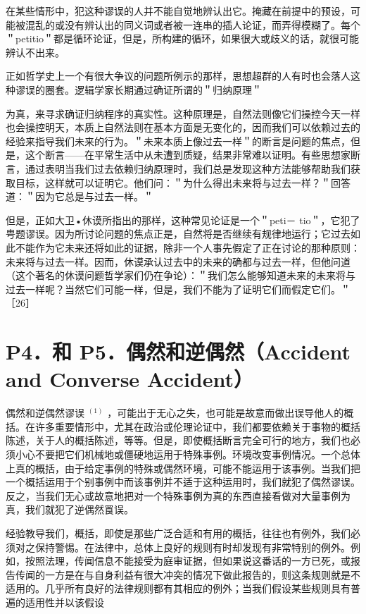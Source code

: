 在某些情形中，犯这种谬误的人并不能自觉地辨认出它。掩藏在前提中的预设，可能被混乱的或没有辨认出的同义词或者被一连串的插人论证，而弄得模糊了。每个＂petitio＂都是循环论证，但是，所构建的循环，如果很大或歧义的话，就很可能辨认不出来。

正如哲学史上一个有很大争议的问题所例示的那样，思想超群的人有时也会落人这种谬误的圈套。逻辑学家长期通过确证所谓的＂归纳原理＂

为真，来寻求确证归纳程序的真实性。这种原理是，自然法则像它们操控今天一样也会操控明天，本质上自然法则在基本方面是无变化的，因而我们可以依赖过去的经验来指导我们未来的行为。＂未来本质上像过去一样＂的断言是问题的焦点，但是，这个断言——在平常生活中从未遭到质疑，结果非常难以证明。有些思想家断言，通过表明当我们过去依赖归纳原理时，我们总是发现这种方法能够帮助我们获取目标，这样就可以证明它。他们问：＂为什么得出未来将与过去一样？＂回答道：＂因为它总是与过去一样。＂

但是，正如大卫•休谟所指出的那样，这种常见论证是一个＂peti－ tio＂，它犯了甹题谬误。因为所讨论问题的焦点正是，自然将是否继续有规律地运行；它过去如此不能作为它未来还将如此的证据，除非一个人事先假定了正在讨论的那种原则：未来将与过去一样。因而，休谟承认过去中的未来的确都与过去一样，但他问道（这个著名的休谟问题哲学家们仍在争论）：＂我们怎么能够知道未来的未来将与过去一样呢？当然它们可能一样，但是，我们不能为了证明它们而假定它们。＂［26］

\section*{P4．和 P5．偶然和逆偶然（Accident and Converse Accident）}
偶然和逆偶然谬误 ${ }^{(1)}$ ，可能出于无心之失，也可能是故意而做出误导他人的概括。在许多重要情形中，尤其在政治或伦理论证中，我们都要依赖关于事物的概括陈述，关于人的概括陈述，等等。但是，即使概括断言完全可行的地方，我们也必须小心不要把它们机械地或僵硬地运用于特殊事例。环境改变事例情况。一个总体上真的概括，由于给定事例的特殊或偶然环境，可能不能运用于该事例。当我们把一个概括运用于个别事例中而该事例并不适于这种运用时，我们就犯了偶然谬误。反之，当我们无心或故意地把对一个特殊事例为真的东西直接看做对大量事例为真，我们就犯了逆偶然䍚误。

经验教导我们，概括，即使是那些广泛合适和有用的概括，往往也有例外，我们必须对之保持警惕。在法律中，总体上良好的规则有时却发现有非常特别的例外。例如，按照法理，传闻信息不能接受为庭审证据，但如果说这番话的一方已死，或报告传闻的一方是在与自身利益有很大冲突的情况下做此报告的，则这条规则就是不适用的。几乎所有良好的法律规则都有其相应的例外；当我们假设某些规则具有普遍的适用性并以该假设

